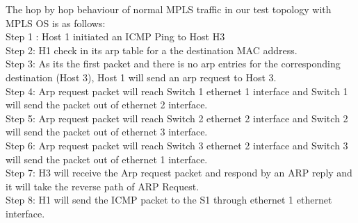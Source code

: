 The hop by hop behaviour of normal MPLS traffic in our test topology with MPLS OS is as follows:\\

Step 1 : Host 1 initiated an ICMP Ping to Host H3\\
Step 2:  H1 check in its arp table for a the destination MAC address.\\
Step 3: As its the first packet and there is no arp entries for the corresponding destination (Host 3), Host 1 will send an arp request to Host 3.\\
Step 4: Arp request packet will reach Switch 1 ethernet 1 interface and Switch 1 will send the packet out of ethernet 2 interface.\\
Step 5: Arp request packet will reach Switch 2 ethernet 2 interface and Switch 2 will send the packet out of ethernet 3 interface.\\
Step 6: Arp request packet will reach Switch 3 ethernet 2 interface and Switch 3 will send the packet out of ethernet 1 interface.\\
Step 7: H3 will receive the Arp request packet and respond by an ARP reply and it will take the reverse path of ARP Request.\\
Step 8: H1 will send the ICMP packet to the S1 through ethernet 1 ethernet interface.\\

